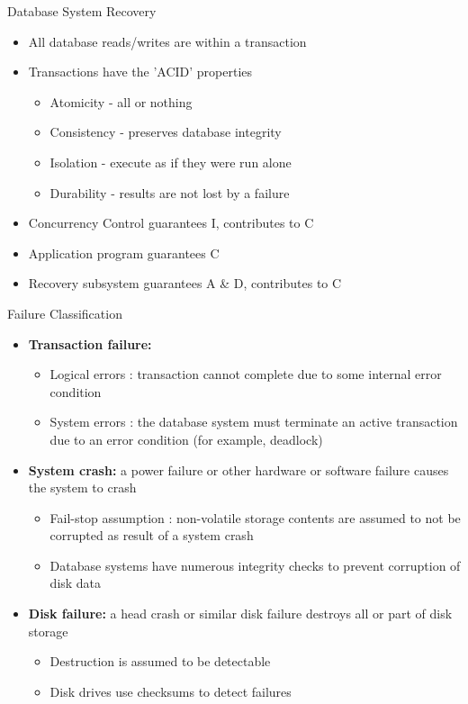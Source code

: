\documentclass[aspectratio=169, xcolor=dvipsnames]{beamer}
\begin{document}
\begin{frame}{Database System Recovery}
    \begin{itemize}[<+->]
        \item All database reads/writes are within a transaction
        \item Transactions have the 'ACID' properties
        \begin{itemize}
            \item[$\triangleright$] Atomicity - all or nothing
            \item[$\triangleright$] Consistency - preserves database integrity
            \item[$\triangleright$] Isolation - execute as if they were run alone
            \item[$\triangleright$] Durability - results are not lost by a failure
        \end{itemize}
        \item Concurrency Control guarantees I, contributes to C
        \item Application program guarantees C
        \item Recovery subsystem guarantees A \& D, contributes to C
    \end{itemize}
\end{frame}

\begin{frame}{Failure Classification}
    \begin{itemize}[<+->]
        \item \textbf{Transaction failure:}
        \begin{itemize}
            \item[$\triangleright$] Logical errors : transaction cannot complete due to some internal error condition
            \item[$\triangleright$] System errors : the database system must terminate an active transaction due to an error condition (for example, deadlock)
        \end{itemize}
        \item \textbf{System crash:} a power failure or other hardware or software failure causes the system to crash
        \begin{itemize}
            \item[$\triangleright$] Fail-stop assumption : non-volatile storage contents are assumed to not be corrupted as result of a system crash
            \item[$\triangleright$] Database systems have numerous integrity checks to prevent corruption of disk data
        \end{itemize}
        \item \textbf{Disk failure:} a head crash or similar disk failure destroys all or part of disk storage
        \begin{itemize}
            \item[$\triangleright$] Destruction is assumed to be detectable
            \item[$\triangleright$] Disk drives use checksums to detect failures
        \end{itemize}
    \end{itemize}
\end{frame}
\end{document}
